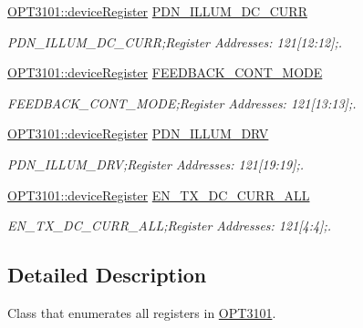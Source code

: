 \begin{DoxyCompactItemize}
\mbox{\hyperlink{class_o_p_t3101_1_1device_register}{O\+P\+T3101\+::device\+Register}} \mbox{\hyperlink{class_o_p_t3101_1_1registers_abfb024eafa0195cb9601486b03eb8f3d}{P\+D\+N\+\_\+\+I\+L\+L\+U\+M\+\_\+\+D\+C\+\_\+\+C\+U\+RR}}
\begin{DoxyCompactList}\small\item\em P\+D\+N\+\_\+\+I\+L\+L\+U\+M\+\_\+\+D\+C\+\_\+\+C\+U\+RR;Register Addresses\+: 121\mbox{[}12\+:12\mbox{]};. \end{DoxyCompactList}\item 
\mbox{\hyperlink{class_o_p_t3101_1_1device_register}{O\+P\+T3101\+::device\+Register}} \mbox{\hyperlink{class_o_p_t3101_1_1registers_aa633043881c8918ff9713cc0371f6b70}{F\+E\+E\+D\+B\+A\+C\+K\+\_\+\+C\+O\+N\+T\+\_\+\+M\+O\+DE}}
\begin{DoxyCompactList}\small\item\em F\+E\+E\+D\+B\+A\+C\+K\+\_\+\+C\+O\+N\+T\+\_\+\+M\+O\+DE;Register Addresses\+: 121\mbox{[}13\+:13\mbox{]};. \end{DoxyCompactList}\item 
\mbox{\hyperlink{class_o_p_t3101_1_1device_register}{O\+P\+T3101\+::device\+Register}} \mbox{\hyperlink{class_o_p_t3101_1_1registers_af52ec58afe469144cebcd4617790b066}{P\+D\+N\+\_\+\+I\+L\+L\+U\+M\+\_\+\+D\+RV}}
\begin{DoxyCompactList}\small\item\em P\+D\+N\+\_\+\+I\+L\+L\+U\+M\+\_\+\+D\+RV;Register Addresses\+: 121\mbox{[}19\+:19\mbox{]};. \end{DoxyCompactList}\item 
\mbox{\hyperlink{class_o_p_t3101_1_1device_register}{O\+P\+T3101\+::device\+Register}} \mbox{\hyperlink{class_o_p_t3101_1_1registers_a4f79290093776d006e9d295134fe5a12}{E\+N\+\_\+\+T\+X\+\_\+\+D\+C\+\_\+\+C\+U\+R\+R\+\_\+\+A\+LL}}
\begin{DoxyCompactList}\small\item\em E\+N\+\_\+\+T\+X\+\_\+\+D\+C\+\_\+\+C\+U\+R\+R\+\_\+\+A\+LL;Register Addresses\+: 121\mbox{[}4\+:4\mbox{]};. \end{DoxyCompactList}\end{DoxyCompactItemize}


\subsection{Detailed Description}
Class that enumerates all registers in \mbox{\hyperlink{namespace_o_p_t3101}{O\+P\+T3101}}. 


